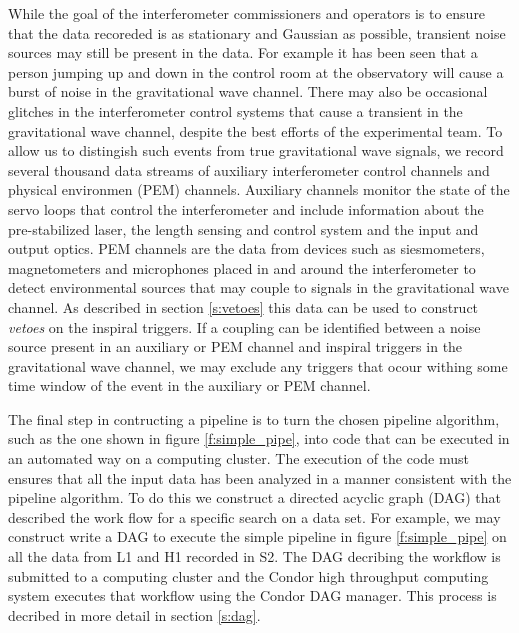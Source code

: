 While the goal of the interferometer commissioners and operators is to ensure
that the data recoreded is as stationary and Gaussian as possible, transient
noise sources may still be present in the data. For example it has been seen
that a person jumping up and down in the control room at the observatory will
cause a burst of noise in the gravitational wave channel. There may also be
occasional glitches in the interferometer control systems that cause a
transient in the gravitational wave channel, despite the best efforts of the
experimental team. To allow us to distingish such events from true
gravitational wave signals, we record several thousand data streams of
auxiliary interferometer control channels and physical environmen (PEM)
channels. Auxiliary channels monitor the state of the servo loops that control
the interferometer and include information about the pre-stabilized laser, the
length sensing and control system and the input and output optics. PEM
channels are the data from devices such as siesmometers, magnetometers and
microphones placed in and around the interferometer to detect environmental
sources that may couple to signals in the gravitational wave channel. As
described in section \ref{s:vetoes} this data can be used to construct
\emph{vetoes} on the inspiral triggers. If a coupling can be identified
between a noise source present in an auxiliary or PEM channel and inspiral
triggers in the gravitational wave channel, we may exclude any triggers that
ocour withing some time window of the event in the auxiliary or PEM channel.

The final step in contructing a pipeline is to turn the chosen pipeline
algorithm, such as the one shown in figure \ref{f:simple_pipe}, into code that
can be executed in an automated way on a computing cluster. The execution of
the code must ensures that all the input data has been analyzed in a manner
consistent with the pipeline algorithm. To do this we construct a directed
acyclic graph (DAG) that described the work flow for a specific search on a
data set. For example, we may construct write a DAG to execute the simple
pipeline in figure \ref{f:simple_pipe} on all the data from L1 and H1 recorded
in S2. The DAG decribing the workflow is submitted to a computing cluster and
the Condor high throughput computing system executes that workflow using the
Condor DAG manager. This process is decribed in more detail in section
\ref{s:dag}.

